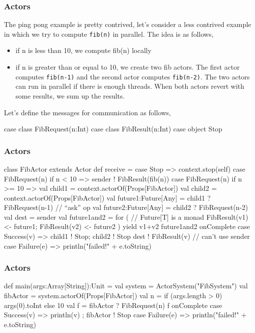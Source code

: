 \documentclass{beamer}
\newcommand{\beb}{\begin{exampleblock}}
\newcommand{\eeb}{\end{exampleblock}}
\begin{document}
\begin{frame}[fragile]
\frametitle{Actors}
The ping pong example is pretty contrived, let's consider a less
contrived example in which we try to compute {\tt fib(n)} in
parallel. The idea is as follows,
\begin{itemize}
\item if n is less than 10, we compute fib(n) locally
\item if n is greater than or equal to 10, we create two fib
  actors. The first actor computes {\tt fib(n-1)} and the second actor
  computes {\tt fib(n-2)}. The two actors can run in parallel if there
  is enough threads. When both actors revert with some results, we sum up the results.
\end{itemize}
Let's define the messages for communication as follows,
\beb{}
\begin{code}
  case class FibRequest(n:Int)
  case class FibResult(n:Int)
  case object Stop
\end{code}
\eeb
\end{frame}

\begin{frame}[fragile]
\frametitle{Actors}
\beb{}
{\scriptsize
\begin{code}
class FibActor extends Actor {
  def receive = {
    case Stop => context.stop(self)
    case FibRequest(n) if n < 10 => sender ! FibResult(fib(n))
    case FibRequest(n) if n >= 10 => {
      val child1 = context.actorOf(Props[FibActor]) 
      val child2 = context.actorOf(Props[FibActor])
      val future1:Future[Any] = child1 ? FibRequest(n-1) // ``ask'' op
      val future2:Future[Any] = child2 ? FibRequest(n-2)
      val dest = sender
      val future1and2 = for ( // Future[T] is a monad
        FibResult(v1) <- future1;
        FibResult(v2) <- future2 
      ) yield v1+v2
      future1and2 onComplete {
        case Success(v) => 
        child1 ! Stop; child2 ! Stop
        dest ! FibResult(v) // can't use sender
        case Failure(e) => println("failed!" + e.toString)
      }
    }
  }
}
\end{code}
}
\eeb
\end{frame}

\begin{frame}[fragile]
\frametitle{Actors}
\beb{}
\begin{code}
def main(args:Array[String]):Unit = {
  val system = ActorSystem("FibSystem")
  val fibActor = system.actorOf(Props[FibActor])
  val n = if (args.length > 0) args(0).toInt else 10
  val f = fibActor ? FibRequest(n)
  f onComplete {
    case Success(v) => { println(v) ; fibActor ! Stop}
    case Failure(e) => println("failed!" + e.toString)
  }
}
\end{code}
\eeb
\end{frame}
\end{document}
